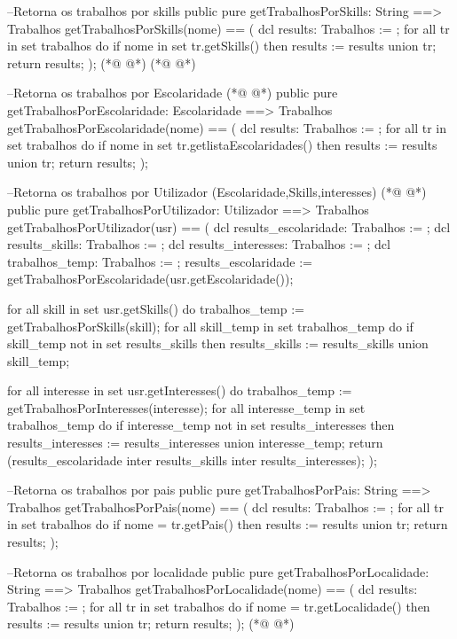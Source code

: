 \begin{vdmpp}[breaklines=true]
 --Retorna os trabalhos por skills
 public pure getTrabalhosPorSkills: String ==> Trabalhos
 getTrabalhosPorSkills(nome) == (
  dcl results: Trabalhos := {};
  for all tr in set trabalhos do
   if nome in set tr.getSkills() then
    results := results union {tr};
  return results;
 );
(*@
\label{getTrabalhosPorLocalidade:74}
@*)
(*@
\label{getTrabalhosPorPais:74}
@*)

 --Retorna os trabalhos por Escolaridade
(*@
\label{getTrabalhosPorEscolaridade:76}
@*)
 public pure getTrabalhosPorEscolaridade: Escolaridade ==> Trabalhos
 getTrabalhosPorEscolaridade(nome) == (
  dcl results: Trabalhos := {};
  for all tr in set trabalhos do
   if nome in set tr.getlistaEscolaridades() then
    results := results union {tr};
  return results;
 );
 
 --Retorna os trabalhos por Utilizador (Escolaridade,Skills,interesses)
(*@
\label{getTrabalhosPorUtilizador:86}
@*)
 public pure getTrabalhosPorUtilizador: Utilizador ==> Trabalhos
 getTrabalhosPorUtilizador(usr) == (
  dcl results_escolaridade: Trabalhos := {};
  dcl results_skills: Trabalhos := {};
  dcl results_interesses: Trabalhos := {};
  dcl trabalhos_temp: Trabalhos := {};
  results_escolaridade := getTrabalhosPorEscolaridade(usr.getEscolaridade());
  
  for all skill in set usr.getSkills() do
   trabalhos_temp := getTrabalhosPorSkills(skill);
   for all skill_temp in set trabalhos_temp do
    if skill_temp not in set results_skills then
     results_skills := results_skills union {skill_temp};
     
  for all interesse in set usr.getInteresses() do
   trabalhos_temp := getTrabalhosPorInteresses(interesse);
   for all interesse_temp in set trabalhos_temp do
    if interesse_temp not in set results_interesses then
     results_interesses := results_interesses union {interesse_temp};
  return (results_escolaridade inter results_skills inter results_interesses);
 );
 
 --Retorna os trabalhos por pais
 public pure getTrabalhosPorPais: String ==> Trabalhos
 getTrabalhosPorPais(nome) == (
  dcl results: Trabalhos := {};
  for all tr in set trabalhos do
   if nome = tr.getPais() then
    results := results union {tr};
  return results;
 );
 
 --Retorna os trabalhos por localidade
 public pure getTrabalhosPorLocalidade: String ==> Trabalhos
 getTrabalhosPorLocalidade(nome) == (
  dcl results: Trabalhos := {};
  for all tr in set trabalhos do
   if nome = tr.getLocalidade() then
    results := results union {tr};
  return results;
 );
(*@
\label{getUtilizadoresPorInteresses:127}
@*)
 

\end{vdmpp}
